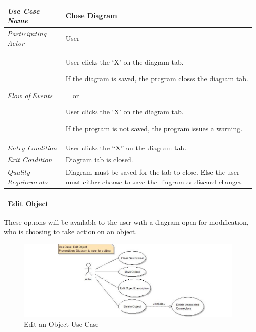 \documentclass[twoside,letterpaper]{article}
\newenvironment{my_enumerate}{
\begin{enumerate}
  \setlength{\itemsep}{1pt}
  \setlength{\parskip}{0pt}
  \setlength{\parsep}{0pt}}{\end{enumerate}
}
\begin{document}
\begin{flushleft}
\tablehead{}
\begin{tabular}{|m{2.0in} m{5.0in}|}
\hline
{\bfseries\emph{Use Case Name}}
& {\bfseries Close Diagram}
\\\hline
\emph{Participating Actor}
& User
\\\hline
\emph{Flow of Events}
& \begin{my_enumerate}
\item User clicks the `X' on the diagram tab.
\item If the diagram is saved, the program closes the diagram tab.
\end{my_enumerate}
\ ~or
\begin{my_enumerate}
\item User clicks the `X' on the diagram tab.
\item If the program is not saved, the program issues a warning.
\end{my_enumerate}
\\\hline
\emph{Entry Condition}
& User clicks the ``X'' on the diagram tab.
\\\hline
\emph{Exit Condition}
& Diagram tab is closed.
\\\hline
\emph{Quality Requirements}
& Diagram must be saved for the tab to close. Else the user must either choose to save the diagram or discard changes.
\\\hline
\end{tabular}
\end{flushleft}
\bigskip



\clearpage

\paragraph[\ Use Category]
{\ Edit Object} {These options will be available to the user with a diagram open for modification, who is choosing to take action on an object.}

\begin{figure}[h]
\centering
\includegraphics[width=6.0in]{ucaseEditObj.jpg}
\caption{Edit an Object Use Case}
\end{figure}
\end{document}
